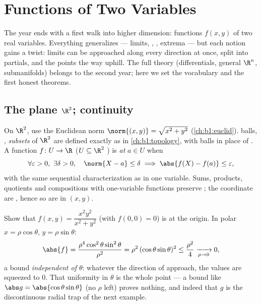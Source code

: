 \chapter{Functions of Two Variables}\label{ch:b1:multivar}

The year ends with a first walk into higher dimension: functions
$f(x, y)$ of two real variables. Everything generalizes --- limits,
, , extrema --- but each notion gains a twist:
limits can be approached along every direction at once, 
split into partials, and the  points the way uphill. The
full theory (differentials, general $\R^n$, submanifolds) belongs to
the second year; here we set the vocabulary and the first honest
theorems.

\section{The plane $\R^2$; continuity}

\begin{definition}\label{def:b1:multivar:topology}
On $\R^2$, use the Euclidean norm $\norm{(x,y)} = \sqrt{x^2 + y^2}$
(\cref{ch:b1:euclid}).  balls, , \emph{
subsets} of $\R^2$ are defined exactly as in
\cref{ch:b1:topology}, with balls in place of . A function
$f \colon U \to \R$ ($U \subseteq \R^2$ ) is \emph{
at} $a \in U$ when
\[
\forall\varepsilon > 0,\ \exists\delta > 0, \quad
\norm{X - a} \leq \delta \implies \abs{f(X) - f(a)} \leq
\varepsilon,
\]
with the same sequential characterization as in one variable.
Sums, products, quotients and compositions with 
one-variable functions preserve ; the coordinate  are
, hence so are  in $(x,y)$.
\end{definition}

\begin{example}
\label{ex:b1:multivar:polarbound}
Show that $f(x, y) = \dfrac{x^2y^2}{x^2 + y^2}$ (with $f(0,0) =
0$) is  at the origin. In polar  $x =
\rho\cos\theta$, $y = \rho\sin\theta$:
\[
\abs{f} = \frac{\rho^4\cos^2\theta\sin^2\theta}{\rho^2}
= \rho^2\,(\cos\theta\sin\theta)^2 \leq \frac{\rho^2}{4}
\xrightarrow[\rho \to 0]{} 0 ,
\]
a bound \emph{independent of $\theta$}: whatever the direction
of approach, the values are squeezed to $0$. That uniformity in
$\theta$ is the whole point --- a bound like $\abs g =
\abs{\cos\theta\sin\theta}$ (no $\rho$ left) proves nothing,
and indeed that $g$ is the discontinuous radial trap of the
next example.
\end{example}

